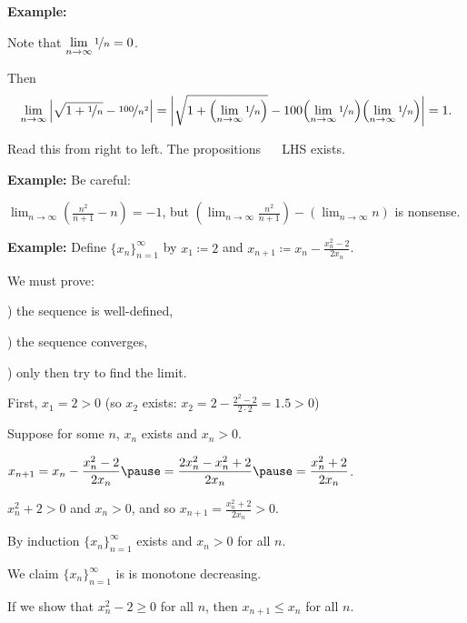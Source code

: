 \documentclass[10pt,aspectratio=149]{beamer}
\begin{document}
\begin{frame}

\textbf{Example:}

Note that
$\lim\limits_{n\to\infty} \nicefrac{1}{n} = 0$.

\pause
Then
\begin{equation*}
\lim_{n\to \infty}
\left\lvert {\sqrt{1 + \nicefrac{1}{n}} - \nicefrac{100}{n^2}} \right\rvert =  
\left\lvert {\sqrt{1 + \Bigl(\lim_{n\to\infty} \nicefrac{1}{n}\Bigr)} -
100 \Bigl(\lim_{n\to\infty} \nicefrac{1}{n}\Bigr)\Bigl(\lim_{n\to\infty} \nicefrac{1}{n}\Bigr)} \right\rvert = 1.
\end{equation*}

\pause
Read this from right to left.  The propositions ~\thus~ LHS exists.

\pause
\medskip

\textbf{Example:}
Be careful:

\medskip

$\displaystyle
\lim_{n\to \infty} \left( \frac{n^2}{n+1} - n \right)
= -1$,
\quad
\pause
but
\quad
$\displaystyle \left(\lim_{n\to\infty} \frac{n^2}{n+1}\right) -
\left(\lim_{n\to\infty} n\right)$ is nonsense.

\end{frame}


\begin{frame}
\textbf{Example:}
Define $\{ x_n \}_{n=1}^\infty$ by $x_1 \coloneqq 2$ and
$\displaystyle x_{n+1} \coloneqq x_n - \frac{x_n^2-2}{2x_n}$.

\medskip
\pause

We must prove:

) the sequence is well-defined,

) the sequence converges,

) only then try to find the limit.

\medskip
\pause

First, $x_1 = 2 > 0$ (so $x_2$ exists: $x_2 = 2-\frac{2^2-2}{2\cdot 2} = 1.5
> 0$)

\medskip
\pause

Suppose for some $n$, $x_n$ exists and $x_n > 0$.

\medskip
\pause

$\displaystyle
x_{n+1} = x_n - \frac{x_n^2-2}{2x_n}
\pause
=
\frac{2x_n^2 - x_n^2+2}{2x_n}
\pause
=
\frac{x_n^2+2}{2x_n}$.

\medskip
\pause

$x_n^2+2 > 0$ and $x_n > 0$,
\pause
and so
$x_{n+1} = \frac{x_n^2+2}{2x_n} > 0$.

\pause
By induction $\{ x_n \}_{n=1}^\infty$ exists and $x_n > 0$ for all $n$.

\medskip
\pause

We claim $\{ x_n \}_{n=1}^\infty$ is is monotone decreasing.

\medskip
\pause

If we show that $x_n^2-2 \geq 0$ for all $n$, then $x_{n+1} \leq x_n$ for all $n$.

\end{frame}
\end{document}
